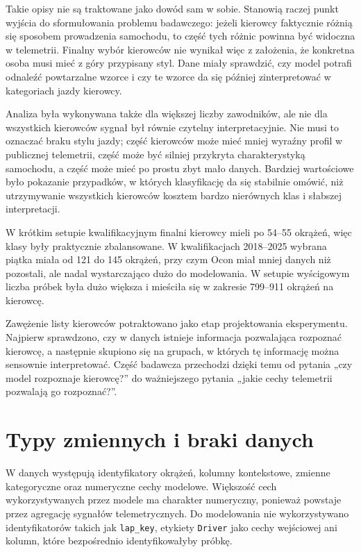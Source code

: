 \documentclass[printmode,pl]{mgr}
\begin{document}
Takie opisy nie są traktowane jako dowód sam w sobie. Stanowią raczej punkt wyjścia do sformułowania problemu badawczego: jeżeli kierowcy faktycznie różnią się sposobem prowadzenia samochodu, to część tych różnic powinna być widoczna w telemetrii. Finalny wybór kierowców nie wynikał więc z założenia, że konkretna osoba musi mieć z góry przypisany styl. Dane miały sprawdzić, czy model potrafi odnaleźć powtarzalne wzorce i czy te wzorce da się później zinterpretować w kategoriach jazdy kierowcy.

Analiza była wykonywana także dla większej liczby zawodników, ale nie dla wszystkich kierowców sygnał był równie czytelny interpretacyjnie. Nie musi to oznaczać braku stylu jazdy; część kierowców może mieć mniej wyraźny profil w publicznej telemetrii, część może być silniej przykryta charakterystyką samochodu, a część może mieć po prostu zbyt mało danych. Bardziej wartościowe było pokazanie przypadków, w których klasyfikację da się stabilnie omówić, niż utrzymywanie wszystkich kierowców kosztem bardzo nierównych klas i słabszej interpretacji.

W krótkim setupie kwalifikacyjnym finalni kierowcy mieli po 54--55 okrążeń, więc klasy były praktycznie zbalansowane. W kwalifikacjach 2018--2025 wybrana piątka miała od 121 do 145 okrążeń, przy czym Ocon miał mniej danych niż pozostali, ale nadal wystarczająco dużo do modelowania. W setupie wyścigowym liczba próbek była dużo większa i mieściła się w zakresie 799--911 okrążeń na kierowcę.

Zawężenie listy kierowców potraktowano jako etap projektowania eksperymentu. Najpierw sprawdzono, czy w danych istnieje informacja pozwalająca rozpoznać kierowcę, a następnie skupiono się na grupach, w których tę informację można sensownie interpretować. Część badawcza przechodzi dzięki temu od pytania „czy model rozpoznaje kierowcę?” do ważniejszego pytania „jakie cechy telemetrii pozwalają go rozpoznać?”.

\section{Typy zmiennych i braki danych}

W danych występują identyfikatory okrążeń, kolumny kontekstowe, zmienne kategoryczne oraz numeryczne cechy modelowe. Większość cech wykorzystywanych przez modele ma charakter numeryczny, ponieważ powstaje przez agregację sygnałów telemetrycznych. Do modelowania nie wykorzystywano identyfikatorów takich jak \texttt{lap\_key}, etykiety \texttt{Driver} jako cechy wejściowej ani kolumn, które bezpośrednio identyfikowałyby próbkę.
\end{document}
